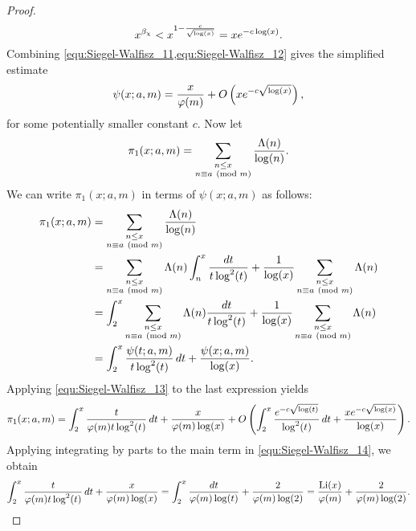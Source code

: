\begin{proof}
      \begin{equation}\label{equ:Siegel-Walfisz_12}
        x^{\beta_{\chi}} < x^{1-\frac{c}{\sqrt{\log(x)}}} = xe^{-c\log(x)}.
      \end{equation}
      Combining \cref{equ:Siegel-Walfisz_11,equ:Siegel-Walfisz_12} gives the simplified estimate
      \begin{equation}\label{equ:Siegel-Walfisz_13}
        \psi(x;a,m) = \frac{x}{\varphi(m)}+O\left(xe^{-c\sqrt{\log(x)}}\right),
      \end{equation}
      for some potentially smaller constant $c$. Now let
      \[
        \pi_{1}(x;a,m) = \sum_{\substack{n \le x \\ n \equiv a \ (\mathrm{mod}\text{ }m)}}\frac{\Lambda(n)}{\log(n)}.
      \]
      We can write $\pi_{1}(x;a,m)$ in terms of $\psi(x;a,m)$ as follows:
      \begin{align*}
        \pi_{1}(x;a,m) &= \sum_{\substack{n \le x \\ n \equiv a \ (\mathrm{mod}\text{ }m)}}\frac{\Lambda(n)}{\log(n)} \\
        &= \sum_{\substack{n \le x \\ n \equiv a \ (\mathrm{mod}\text{ }m)}}\Lambda(n)\int_{n}^{x}\frac{dt}{t\log^{2}(t)}+\frac{1}{\log(x)}\sum_{\substack{n \le x \\ n \equiv a \ (\mathrm{mod}\text{ }m)}}\Lambda(n) \\
        &= \int_{2}^{x}\sum_{\substack{n \le x \\ n \equiv a \ (\mathrm{mod}\text{ }m)}}\Lambda(n)\frac{dt}{t\log^{2}(t)}+\frac{1}{\log(x)}\sum_{\substack{n \le x \\ n \equiv a \ (\mathrm{mod}\text{ }m)}}\Lambda(n) \\
        &= \int_{2}^{x}\frac{\psi(t;a,m)}{t\log^{2}(t)}\,dt+\frac{\psi(x;a,m)}{\log(x)}.
      \end{align*}
      Applying \cref{equ:Siegel-Walfisz_13} to the last expression yields
      \begin{equation}\label{equ:Siegel-Walfisz_14}
        \pi_{1}(x;a,m) = \int_{2}^{x}\frac{t}{\varphi(m)t\log^{2}(t)}\,dt+\frac{x}{\varphi(m)\log(x)}+O\left(\int_{2}^{x}\frac{e^{-c\sqrt{\log(t)}}}{\log^{2}(t)}\,dt+\frac{xe^{-c\sqrt{\log(x)}}}{\log(x)}\right).
      \end{equation}
      Applying integrating by parts to the main term in \cref{equ:Siegel-Walfisz_14}, we obtain
      \begin{equation}\label{equ:Siegel-Walfisz_15}
        \int_{2}^{x}\frac{t}{\vphi(m)t\log^{2}(t)}\,dt+\frac{x}{\vphi(m)\log(x)} = \int_{2}^{x}\frac{dt}{\vphi(m)\log(t)}+\frac{2}{\vphi(m)\log(2)} = \frac{\Li(x)}{\vphi(m)}+\frac{2}{\vphi(m)\log(2)}.

\end{equation}
\end{proof}
